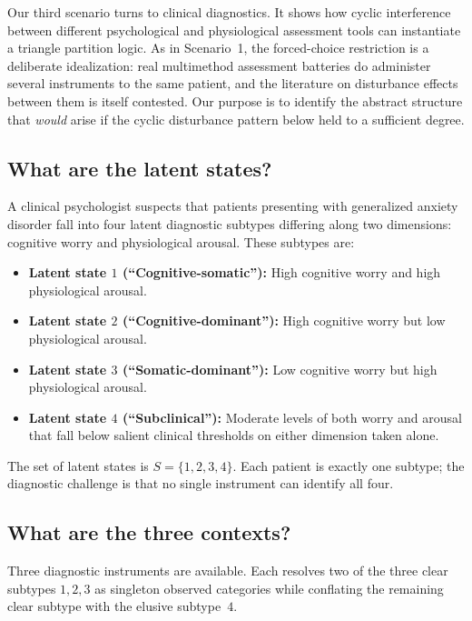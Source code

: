 \documentclass[aps,pra,twocolumn,superscriptaddress,floatfix,longbibliography]{revtex4-2}
\begin{document}
Our third scenario turns to clinical diagnostics. It shows how
cyclic interference between different psychological and physiological
assessment tools can instantiate a triangle partition logic. As in
Scenario~1, the forced-choice restriction is a deliberate
idealization: real multimethod assessment batteries do administer
several instruments to the same patient, and the literature on
disturbance effects between them is itself contested. Our purpose is
to identify the abstract structure that \emph{would} arise if the
cyclic disturbance pattern below held to a sufficient degree.

\subsection{What are the latent states?}

A clinical psychologist suspects that patients presenting with
generalized anxiety disorder fall into four latent diagnostic
subtypes differing along two dimensions: cognitive worry and
physiological arousal. These subtypes are:
\begin{itemize}
\item \textbf{Latent state $1$ (``Cognitive-somatic''):} High
cognitive worry and high physiological arousal.
\item \textbf{Latent state $2$ (``Cognitive-dominant''):} High
cognitive worry but low physiological arousal.
\item \textbf{Latent state $3$ (``Somatic-dominant''):} Low
cognitive worry but high physiological arousal.
\item \textbf{Latent state $4$ (``Subclinical''):} Moderate levels
of both worry and arousal that fall below salient clinical
thresholds on either dimension taken alone.
\end{itemize}
The set of latent states is $S=\{1,2,3,4\}$. Each patient is exactly
one subtype; the diagnostic challenge is that no single instrument
can identify all four.

\subsection{What are the three contexts?}

Three diagnostic instruments are available. Each resolves two of the
three clear subtypes $1,2,3$ as singleton observed categories while
conflating the remaining clear subtype with the elusive subtype~$4$.
\end{document}
